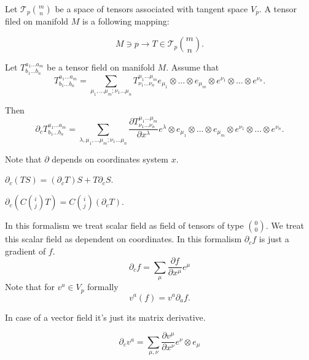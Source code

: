 \documentclass[main.tex]{subfiles}
\begin{document}
Let  $\mathcal{T}_p\binom{m}{n}$ be a space of tensors associated with tangent space $V_p$. A tensor filed on manifold $M$ is a following mapping:

\begin{equation}
M \ni p \to T \in \mathcal{T}_p\binom{m}{n}.
\end{equation}

Let $T^{a_1\dots a_m}_{b_1\dots b_n}$ be a tensor field on manifold $M$. Assume that
\begin{equation}
T^{a_1\dots a_m}_{b_1\dots b_n} = \sum\limits_{\mu_1,\dots\mu_m;\nu_1\dots\mu_n} T^{\mu_1\dots\mu_m}_{\nu_1\dots\nu_n} e_{\mu_1} \otimes \dots \otimes e_{\mu_m} \otimes e^{\nu_1} \otimes \dots \otimes e^{\nu_n}.
\end{equation}

Then 
\begin{equation}
\partial_c T^{a_1\dots a_m}_{b_1\dots b_n} = \sum\limits_{\lambda, \mu_1,\dots\mu_m;\nu_1\dots\mu_n}\frac{\partial T^{\mu_1\dots\mu_m}_{\nu_1\dots\nu_n}}{\partial x^\lambda} e^\lambda \otimes e_{\mu_1} \otimes \dots \otimes e_{\mu_m} \otimes e^{\nu_1} \otimes \dots \otimes e^{\nu_n}.
\end{equation}

Note that $\partial$ depends on coordinates system $x$.

\begin{fact}
$\partial_c(TS) = (\partial_c T) S + T\partial_c S$.
\end{fact}

\begin{fact}
$\partial_c (C\binom{i}{j} T) = C\binom{i}{j} (\partial_c T)$.
\end{fact}

In this formalism we treat scalar field as field of tensors of type $\binom{0}{0}$. We treat this scalar field as dependent on coordinates. In this formalism $\partial_c f$ is just a gradient of $f$.
\begin{equation}
\boxed{\partial_c f = \sum_\mu \frac{\partial f}{\partial x^\mu} e^\mu}
\end{equation}
Note that for $v^a \in V_p$ formally
\begin{equation}
v^a(f) = v^a \partial_a f.
\end{equation}

In case of a vector field it's just its matrix derivative. 

\begin{equation}
\boxed{\partial_c v^a = \sum_{\mu, \nu} \frac{\partial v^\mu}{\partial x^\nu} e^\nu \otimes e_\mu}
\end{equation}
\end{document}
